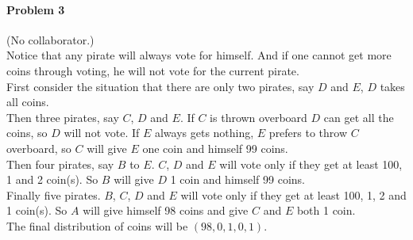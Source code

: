\documentclass[12pt]{article}
\begin{document}
\paragraph{Problem 3} (No collaborator.)
\\
Notice that any pirate will always vote for himself. And if one cannot
get more coins through voting, he will not vote for the current pirate.
\\
First consider the situation that there are only two pirates, say
$D$ and $E$, $D$ takes all coins. 
\\
Then three pirates, say $C$, $D$ and $E$. If $C$ is thrown overboard $D$ can get all the
coins, so $D$ will not vote. If $E$ always gets nothing, $E$ prefers to throw $C$ overboard, so $C$ will
give $E$ one coin and himself 99 coins.
\\
Then four pirates, say $B$ to $E$. $C$, $D$ and $E$
will vote only if they get at least 100, 1 and 2 coin(s). So $B$ will give $D$ 1 coin and himself 99 coins.
\\
Finally five pirates. $B$, $C$, $D$ and $E$ will
vote only if they get at least 100, 1, 2 and 1 coin(s). So $A$
will give himself 98 coins and give $C$ and $E$ both 1 coin.
\\
The final distribution of coins will be $(98, 0, 1, 0, 1)$.



\begin{thebibliography}{99}



\end{thebibliography}
\end{document}
